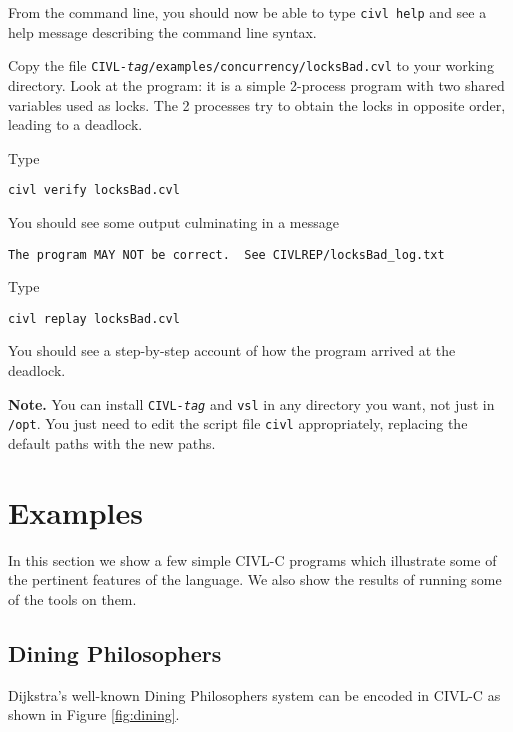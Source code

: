 From the command line, you should now be able to type \texttt{civl
  help} and see a help message describing the command line syntax.

Copy the file
\texttt{CIVL-\textit{tag}/examples/concurrency/locksBad.cvl} to your
working directory.  Look at the program: it is a simple 2-process
program with two shared variables used as locks.  The 2 processes try
to obtain the locks in opposite order, leading to a deadlock.

Type
\begin{verbatim}
civl verify locksBad.cvl
\end{verbatim}
You should see some output culminating in a message 
\begin{verbatim}
The program MAY NOT be correct.  See CIVLREP/locksBad_log.txt
\end{verbatim}

Type
\begin{verbatim}
civl replay locksBad.cvl
\end{verbatim}
You should see a step-by-step account of how the program arrived
at the deadlock.

\textbf{Note.}  You can install \texttt{CIVL-\textit{tag}} and
\texttt{vsl} in any directory you want, not just in \texttt{/opt}.
You just need to edit the script file \texttt{civl} appropriately,
replacing the default paths with the new paths.

\chapter{Examples}

In this section we show a few simple CIVL-C programs which illustrate
some of the pertinent features of the language. We also show the results
of running some of the tools on them.

\section{Dining Philosophers}

Dijkstra's well-known Dining Philosophers system can be encoded in
CIVL-C as shown in Figure \ref{fig:dining}.

